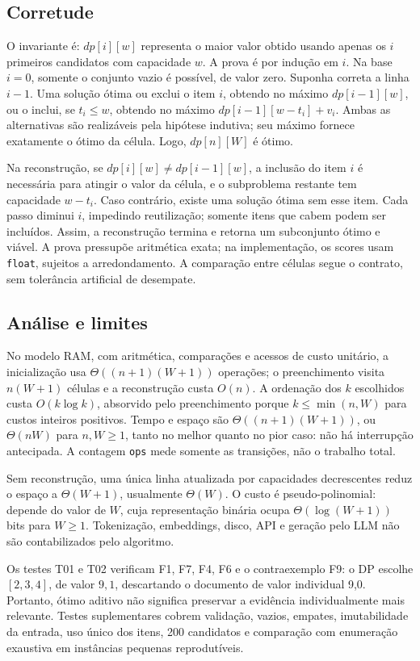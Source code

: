 \subsection{Corretude}
O invariante é: $dp[i][w]$ representa o maior valor obtido usando apenas os $i$ primeiros candidatos com capacidade $w$. A prova é por indução em $i$. Na base $i=0$, somente o conjunto vazio é possível, de valor zero. Suponha correta a linha $i-1$. Uma solução ótima ou exclui o item $i$, obtendo no máximo $dp[i-1][w]$, ou o inclui, se $t_i\leq w$, obtendo no máximo $dp[i-1][w-t_i]+v_i$. Ambas as alternativas são realizáveis pela hipótese indutiva; seu máximo fornece exatamente o ótimo da célula. Logo, $dp[n][W]$ é ótimo.

Na reconstrução, se $dp[i][w]\neq dp[i-1][w]$, a inclusão do item $i$ é necessária para atingir o valor da célula, e o subproblema restante tem capacidade $w-t_i$. Caso contrário, existe uma solução ótima sem esse item. Cada passo diminui $i$, impedindo reutilização; somente itens que cabem podem ser incluídos. Assim, a reconstrução termina e retorna um subconjunto ótimo e viável. A prova pressupõe aritmética exata; na implementação, os scores usam \texttt{float}, sujeitos a arredondamento. A comparação entre células segue o contrato, sem tolerância artificial de desempate.

\subsection{Análise e limites}
No modelo RAM, com aritmética, comparações e acessos de custo unitário, a inicialização usa $\Theta((n+1)(W+1))$ operações; o preenchimento visita $n(W+1)$ células e a reconstrução custa $O(n)$. A ordenação dos $k$ escolhidos custa $O(k\log k)$, absorvido pelo preenchimento porque $k\leq\min(n,W)$ para custos inteiros positivos. Tempo e espaço são $\Theta((n+1)(W+1))$, ou $\Theta(nW)$ para $n,W\geq1$, tanto no melhor quanto no pior caso: não há interrupção antecipada. A contagem \texttt{ops} mede somente as transições, não o trabalho total.

Sem reconstrução, uma única linha atualizada por capacidades decrescentes reduz o espaço a $\Theta(W+1)$, usualmente $\Theta(W)$. O custo é pseudo-polinomial: depende do valor de $W$, cuja representação binária ocupa $\Theta(\log(W+1))$ bits para $W\geq1$. Tokenização, embeddings, disco, API e geração pelo LLM não são contabilizados pelo algoritmo.

Os testes T01 e T02 verificam F1, F7, F4, F6 e o contraexemplo F9: o DP escolhe $[2,3,4]$, de valor $9{,}1$, descartando o documento de valor individual 9,0. Portanto, ótimo aditivo não significa preservar a evidência individualmente mais relevante. Testes suplementares cobrem validação, vazios, empates, imutabilidade da entrada, uso único dos itens, 200 candidatos e comparação com enumeração exaustiva em instâncias pequenas reprodutíveis.

